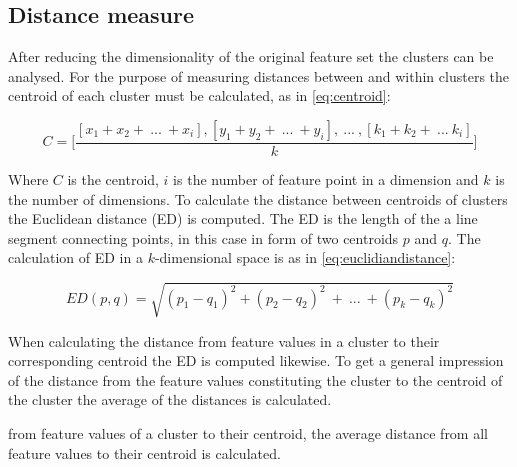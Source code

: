 \subsection{Distance measure} \label{sub:distanceMeasure}
After reducing the dimensionality of the original feature set the clusters can be analysed. For the purpose of measuring distances between and within clusters the centroid of each cluster must be calculated, as in \eqref{eq:centroid}:

\begin{equation} \label{eq:centroid}
	C = \Bigg[ \frac{[x_1+x_2 +~...~+ x_i],[y_1+y_2 +~...~+ y_i] ,~...~,[k_1+k_2 +~...~k_i]}{k} \Bigg]
\end{equation}

Where $C$ is the centroid, $i$ is the number of feature point in a dimension and $k$ is the number of dimensions. To calculate the distance between centroids of clusters the Euclidean distance (ED) is computed. The ED is the length of the a line segment connecting points, in this case in form of two centroids $p$ and $q$. The calculation of ED in a $k$-dimensional space is as in \eqref{eq:euclidiandistance}:

\begin{equation} \label{eq:euclidiandistance}
	ED(p,q) = \sqrt{(p_1-q_1)^2 + (p_2-q_2)^2~+~...~+ (p_k-q_k)^2}
\end{equation} 

When calculating the distance from feature values in a cluster to their corresponding centroid the ED is computed likewise. To get a general impression of the distance from the feature values constituting the cluster to the centroid of the cluster the average of the distances is calculated. 

from feature values of a cluster to their centroid, the average distance from all feature values to their centroid is calculated. 




